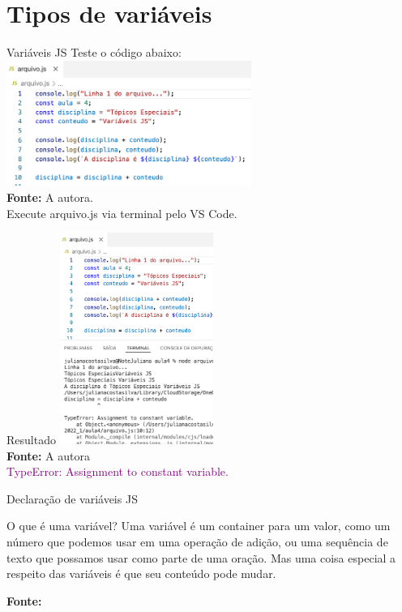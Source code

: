 \documentclass{beamer}
\begin{document}
\section{Tipos de variáveis}
\begin{frame}{Variáveis JS}
Teste o código abaixo:
    \centering
	\includegraphics[width=80mm]{resources/aula_js_4_3.png}\\
    \tiny{ \textbf{Fonte:} A autora.}\\
    Execute arquivo.js via terminal pelo VS Code.
\end{frame}
    \begin{frame}{Resultado}
    \centering
	\includegraphics[width=50mm]{resources/aula_js_4_4.png}\\
            \tiny{\textbf{Fonte:} A autora}\\
            \textcolor{purple}{TypeError: Assignment to constant variable.}
    \end{frame}
    \begin{frame}{Declaração de variáveis JS}
    \begin{block}{O que é uma variável?}
    Uma variável é um container para um valor, como um número que podemos usar em uma operação de adição, ou uma sequência de texto que possamos usar como parte de uma oração. Mas uma coisa especial a respeito das variáveis é que seu conteúdo pode mudar.
    \end{block}
    \centering
    \vspace{0.5cm}
    \tiny{\textbf{Fonte:} \cite{moziladev2022js}}
    \end{frame}
    
\end{document}
